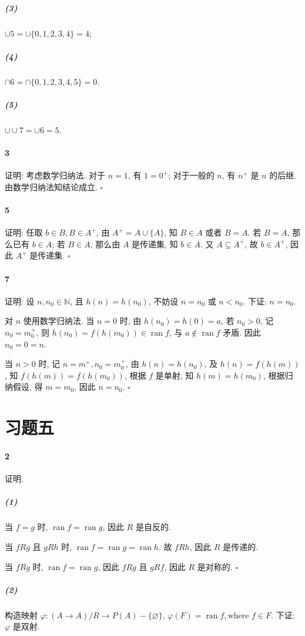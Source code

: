 \documentclass{ctexart}
\def\QED{\hfill $\square$}
\DeclareMathOperator{\ran}{ran}
\begin{document}
\subparagraph*{(3)} $\cup 5=\cup \{0,1,2,3,4\}=4$;

\subparagraph*{(4)} $\cap 6=\cap \{0,1,2,3,4,5\}=0$.

\subparagraph*{(5)} $\cup\cup 7=\cup 6=5$.

\paragraph*{3} 证明: 考虑数学归纳法. 对于 $n=1$, 有 $1=0^+$;
对于一般的 $n$, 有 $n^+$ 是 $n$ 的后继. 由数学归纳法知结论成立. \QED

\paragraph*{5} 证明: 任取 $b\in B, B\in A^+$, 由 $A^+=A\cup \{A\}$,
知 $B\in A$ 或者 $B=A$. 若 $B=A$, 那么已有 $b\in A$;
若 $B\in A$, 那么由 $A$ 是传递集, 知 $b\in A$.
又 $A\subseteq A^+$, 故 $b\in A^+$, 因此 $A^+$ 是传递集. \QED

\paragraph*{7} 证明: 设 $n, n_0 \in \mathbb{N}$, 且 $h(n)=h(n_0)$, 
不妨设 $n=n_0$ 或 $n< n_0$. 下证: $n=n_0$.

对 $n$ 使用数学归纳法.
当 $n=0$ 时, 由 $h(n_0)=h(0)=a$, 若 $n_0>0$, 记 $n_0=m_0^+$, 
则 $h(n_0)=f(h(m_0))\in \ran f$, 与 $a\notin \ran f$ 矛盾. 
因此 $n_0=0=n$.

当 $n>0$ 时, 记 $n=m^+, n_0=m_0^+$, 由 $h(n)=h(n_0)$, 
及 $h(n)=f(h(m))$, 知 $f(h(m))=f(h(m_0))$, 
根据 $f$ 是单射, 知 $h(m)=h(m_0)$, 根据归纳假设, 得 $m=m_0$,
因此 $n=n_0$. \QED

\section*{习题五}

\paragraph*{2} 证明: 

\subparagraph*{(1)} 当 $f=g$ 时, $\ran f=\ran g$,
因此 $R$ 是自反的.

当 $fRg$ 且 $gRh$ 时, $\ran f=\ran g=\ran h$. 故 $fRh$,
因此 $R$ 是传递的. 

当 $fRg$ 时, $\ran f=\ran g$, 因此 $fRg$ 且 $gRf$,
因此 $R$ 是对称的. \QED

\subparagraph*{(2)} 构造映射 $\varphi: (A\mathop{\to} A)/R \mathrel{\to} P(A)-\{\varnothing\}$,
$\varphi(F)=\ran f, \textrm{where } f\in F$.
下证: $\varphi$ 是双射.
\end{document}
